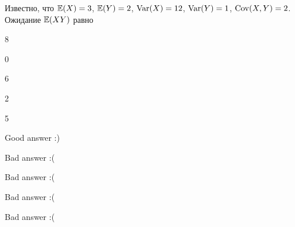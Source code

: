
\begin{question}
Известно, что \(\operatorname{\mathbb{E}}(X)=3\), \(\operatorname{\mathbb{E}}(Y)=2\), \(\operatorname{Var}(X)=12\), \(\operatorname{Var}(Y)=1\),
\(\operatorname{Cov}(X,Y)=2\). Ожидание \(\operatorname{\mathbb{E}}(XY)\) равно
\begin{answerlist}
  \item 8
  \item 0
  \item 6
  \item 2
  \item 5
\end{answerlist}
\end{question}

\begin{solution}
\begin{answerlist}
  \item Good answer :)
  \item Bad answer :(
  \item Bad answer :(
  \item Bad answer :(
  \item Bad answer :(
\end{answerlist}
\end{solution}

